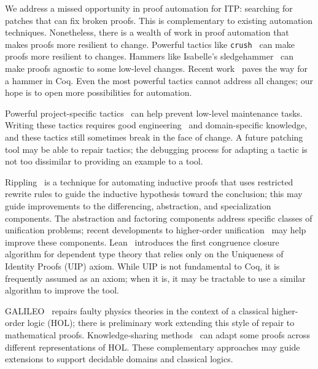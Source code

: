 We address a missed opportunity in proof automation for ITP: searching
for patches that can fix broken proofs.
This is complementary to existing automation techniques. Nonetheless, there is a wealth
of work in proof automation that makes proofs more resilient to change.
Powerful tactics like \lstinline{crush}~\cite{chlipala:cpdt} can make
proofs more resilient to changes. 
Hammers like Isabelle's sledgehammer~\cite{Blanchette2013} can make proofs agnostic to some low-level changes.
Recent work~\cite{coqhammer} paves the way for a hammer in Coq.
Even the most powerful tactics cannot address all changes;
our hope is to open more possibilities for automation.

Powerful project-specific tactics~\cite{chlipala:cpdt, Chlipala2013} can help prevent low-level maintenance tasks.
Writing these tactics requires good engineering~\cite{Gonthier2011} and domain-specific knowledge,
and these tactics still sometimes break in the face of change.
A future patching tool may be able to repair tactics; the debugging process
for adapting a tactic is not too dissimilar to providing an example to a tool.

Rippling~\cite{rippling} is a technique for automating inductive proofs that uses restricted rewrite rules to
guide the inductive hypothesis toward the conclusion; this may guide improvements to the
differencing, abstraction, and specialization components.
The abstraction and factoring components address specific classes of unification problems;
recent developments to higher-order unification~\cite{Miller:2012:PHL:2331097} may help
improve these components.
Lean~\cite{selsam:lean} introduces the first congruence closure algorithm for dependent type theory that
relies only on the Uniqueness of Identity Proofs (UIP) axiom. While UIP is not fundamental to Coq,
it is frequently assumed as an axiom; when it is, it may be tractable to use a similar algorithm to improve the tool.

GALILEO~\cite{bundyreasoning} repairs faulty physics theories
in the context of a classical higher-order logic (HOL); there is preliminary work extending this
style of repair to mathematical proofs. 
Knowledge-sharing methods~\cite{tgck-cicm14} can adapt some proofs across different representations of HOL.
These complementary approaches may guide extensions to support decidable domains and classical logics.
\fi


